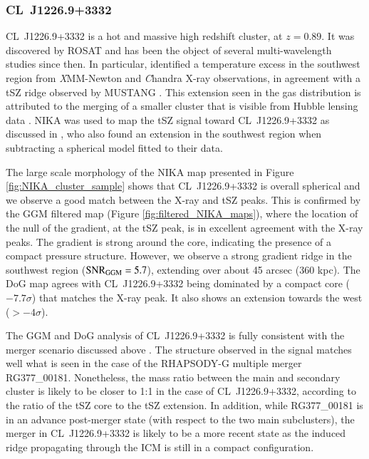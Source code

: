 \documentclass[twocolumn,traditabstract]{aa}
\begin{document}
\subsubsection{CL~J1226.9+3332}
\mbox{CL~J1226.9+3332} is a hot and massive high redshift cluster, at $z=0.89$. It was discovered by ROSAT \citep{Ebeling2001} and has been the object of several multi-wavelength studies since then. In particular, \cite{Maughan2007} identified a temperature excess in the southwest region from {\textit XMM-Newton} and {\textit Chandra} X-ray observations, in agreement with a tSZ ridge observed by MUSTANG \citep{Korngut2011}. This extension seen in the gas distribution is attributed to the merging of a smaller cluster that is visible from Hubble lensing data \citep{Jee2009}. NIKA was used to map the tSZ signal toward \mbox{CL~J1226.9+3332} as discussed in \cite{Adam2015}, who also found an extension in the southwest region when subtracting a spherical model fitted to their data.

The large scale morphology of the NIKA map presented in Figure \ref{fig:NIKA_cluster_sample} shows that \mbox{CL~J1226.9+3332} is overall spherical and we observe a good match between the X-ray and tSZ peaks. This is confirmed by the GGM filtered map (Figure \ref{fig:filtered_NIKA_maps}), where the location of the null of the gradient, at the tSZ peak, is in excellent agreement with the X-ray peaks. The gradient is strong around the core, indicating the presence of a compact pressure structure. However, we observe a strong gradient ridge in the southwest region (${\rm SNR}_{\rm GGM} = 5.7$), extending over about 45 arcsec (360 kpc). The DoG map agrees with \mbox{CL~J1226.9+3332} being dominated by a compact core ($-7.7 \sigma$) that matches the X-ray peak. It also shows an extension towards the west ($> -4 \sigma$).

The GGM and DoG analysis of \mbox{CL~J1226.9+3332} is fully consistent with the merger scenario discussed above \citep[see also][for more details]{Adam2015}. The structure observed in the signal matches well what is seen in the case of the RHAPSODY-G multiple merger RG377\_00181. Nonetheless, the mass ratio between the main and secondary cluster is likely to be closer to 1:1 in the case of \mbox{CL~J1226.9+3332}, according to the ratio of the tSZ core to the tSZ extension. In addition, while RG377\_00181 is in an advance post-merger state (with respect to the two main subclusters), the merger in \mbox{CL~J1226.9+3332} is likely to be a more recent state as the induced ridge propagating through the ICM is still in a compact configuration.
\end{document}

